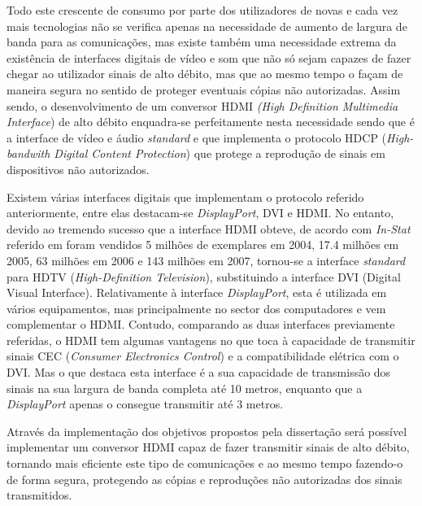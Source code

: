 Todo este crescente de consumo por parte dos utilizadores de novas e cada vez mais tecnologias não se verifica apenas na necessidade de aumento de largura de banda para as comunicações, mas existe também uma necessidade extrema da existência de interfaces digitais de vídeo e som que não só sejam capazes de fazer chegar ao utilizador sinais de alto débito, mas que ao mesmo tempo o façam de maneira segura no sentido de proteger eventuais cópias não autorizadas. Assim sendo, o desenvolvimento de um conversor HDMI \textit{(High Definition Multimedia Interface}) de alto débito enquadra-se perfeitamente nesta necessidade sendo que é a interface de vídeo e áudio \textit{standard} e que implementa o protocolo HDCP (\textit{High-bandwith Digital Content Protection}) que protege a reprodução de sinais em dispositivos não autorizados.

Existem várias interfaces digitais que implementam o protocolo referido anteriormente, entre elas destacam-se \textit{DisplayPort}, DVI e HDMI. No entanto, devido ao tremendo sucesso que a interface HDMI obteve, de acordo com \textit{In-Stat} referido em \cite{R002} foram vendidos 5 milhões de exemplares em 2004, 17.4 milhões em 2005, 63 milhões em 2006 e 143 milhões em 2007, tornou-se a interface \textit{standard} para HDTV (\textit{High-Definition Television}), substituindo a interface DVI (Digital Visual Interface). Relativamente à interface \textit{DisplayPort}, esta é utilizada em vários equipamentos, mas principalmente no sector dos computadores e vem complementar o HDMI. Contudo, comparando as duas interfaces previamente referidas, o HDMI tem algumas vantagens no que toca à capacidade de transmitir sinais CEC (\textit{Consumer Electronics Control}) e a compatibilidade elétrica com o DVI. Mas o que destaca esta interface é a sua capacidade de transmissão dos sinais na sua largura de banda completa até 10 metros, enquanto que a \textit{DisplayPort} apenas o consegue transmitir até 3 metros.

Através da implementação dos objetivos propostos pela dissertação será possível implementar um conversor HDMI capaz de fazer transmitir sinais de alto débito, tornando mais eficiente este tipo de comunicações e ao mesmo tempo fazendo-o de forma segura, protegendo as cópias e reproduções não autorizadas dos sinais transmitidos.
 

